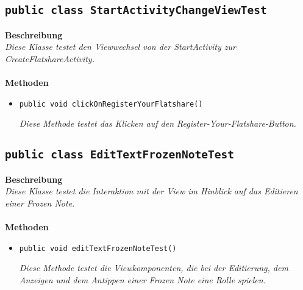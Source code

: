 \documentclass[a4paper]{scrreprt}
\begin{document}
	\subsection{\texttt{public class StartActivityChangeViewTest}}
	\textbf{Beschreibung}\\
	\textit{Diese Klasse testet den Viewwechsel von der StartActivity zur CreateFlatshareActivity.}\\
	\\
	\textbf{Methoden}
	\begin{itemize}
		
		\item\texttt{{public void clickOnRegisterYourFlatshare()}}
		
		\textit{Diese Methode testet das Klicken auf den Register-Your-Flatshare-Button.}
		
	\end{itemize}
	\subsection{\texttt{public class EditTextFrozenNoteTest}}
	\textbf{Beschreibung}\\
	\textit{Diese Klasse testet die Interaktion mit der View im Hinblick auf das Editieren einer Frozen Note.}\\
	\\
	\textbf{Methoden}
	\begin{itemize}
		
		\item\texttt{{public void editTextFrozenNoteTest()}}
		
		\textit{Diese Methode testet die Viewkomponenten, die bei der Editierung, dem Anzeigen und dem Antippen einer Frozen Note eine Rolle spielen.}
		
	\end{itemize}
	
\end{document}
